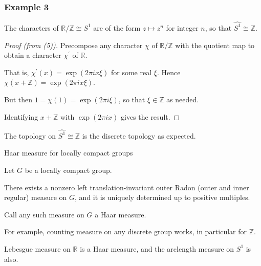 \documentclass[mathserif
]{beamer}
\begin{document}
\begin{frame}
    \frametitle{Example 3}
The characters of $\mathbb{R}/\mathbb{Z}\cong S^1$ are of the form $z\mapsto z^n$ for integer $n$, so that $\widehat{S^1}\cong \mathbb{Z}$. \pause \begin{proof}[Proof (from (5))]
    Precompose any character $\chi$ of $\mathbb{R}/\mathbb{Z}$ with the quotient map to obtain a character $\chi^\prime$ of $\mathbb{R}$.\pause 

    That is, $\chi^\prime(x) = \exp(2\pi i x\xi)$ for some real $\xi$. Hence $\chi(x+\mathbb{Z}) = \exp(2\pi i x\xi)$.\pause 

    But then $1 = \chi(1) = \exp(2\pi i \xi)$, so that $\xi\in \mathbb{Z}$ as needed. \pause 

    Identifying $x+\mathbb{Z}$ with $\exp(2\pi i x)$ gives the result.
\end{proof} \pause
The topology on $\widehat{S^1}\cong\mathbb{Z}$ is the discrete topology as expected.
\end{frame}

\begin{frame}{Haar measure for locally compact groups}
    \begin{Theorem}[Haar]
        Let $G$ be a locally compact group. \pause 

        There exists a nonzero left translation-invariant outer Radon (outer and inner regular) measure on $G$, and it is uniquely determined up to positive multiples.

        Call any such measure on $G$ a Haar measure.
    \end{Theorem}
    \pause

    For example, counting measure on any discrete group works, in particular for $\mathbb{Z}$. 
    \pause 

    Lebesgue measure on $\mathbb{R}$ is a Haar measure, and the arclength measure on $S^1$ is also.
\end{frame}
\end{document}
